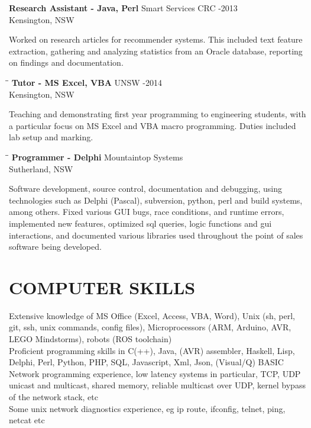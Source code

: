 \documentclass{res}
\begin{document}
\begin{resume}
\begin{tabbing}
    {\bf Research Assistant - Java, Perl} \>Smart Services CRC -2013\\
                             \>Kensington, NSW
   \end{tabbing}\vspace{-20pt}      %
    Worked on research articles for recommender systems. This included text
    feature extraction, gathering and analyzing statistics from an Oracle
    database, reporting on findings and documentation.
   \begin{tabbing}
   \hspace{2.3in}\= \hspace{2.6in}\= \kill %
    {\bf Tutor - MS Excel, VBA} \>UNSW     -2014\\
                           \>Kensington, NSW
   \end{tabbing}\vspace{-20pt}      %
    Teaching and demonstrating first year programming to engineering students,
    with a particular focus on MS Excel and VBA macro programming. Duties
    included lab setup and marking.
   \begin{tabbing}
   \hspace{2.3in}\= \hspace{2.6in}\= \kill %
    {\bf Programmer - Delphi} \>Mountaintop Systems \\
                          \>Sutherland, NSW
   \end{tabbing}\vspace{-20pt}
    Software development, source control, documentation and debugging,
    using technologies such as Delphi (Pascal), subversion, python, perl and
    build systems, among others. Fixed various GUI bugs, race conditions, and
    runtime errors, implemented new features, optimized sql queries, logic
    functions and gui interactions, and documented various libraries used
    throughout the point of sales software being developed.


\section{COMPUTER SKILLS}          
    Extensive knowledge of MS Office (Excel, Access, VBA, Word), Unix (sh, perl, git, ssh, unix commands, config files), Microprocessors (ARM, Arduino, AVR, LEGO Mindstorms), robots (ROS toolchain) \\
    Proficient programming skills in C(++), Java, (AVR) assembler, Haskell, Lisp, Delphi, Perl, Python, PHP, SQL, Javascript, Xml, Json, (Visual/Q) BASIC \\
    Network programming experience, low latency systems in particular, TCP, UDP unicast and multicast, shared memory, reliable multicast over UDP, kernel bypass of the network stack, etc \\
    Some unix network diagnostics experience, eg ip route, ifconfig, telnet, ping, netcat etc
 

\end{resume}
\end{document}

